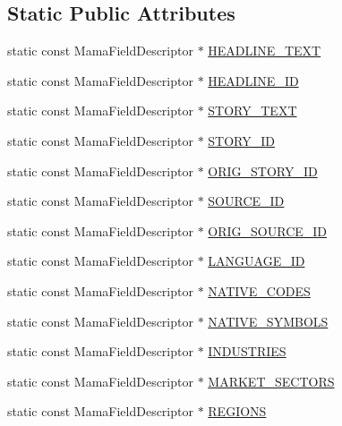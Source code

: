 \subsection*{Static Public Attributes}
\begin{CompactItemize}
\item 
static const Mama\-Field\-Descriptor $\ast$ \hyperlink{classWombat_1_1MamdaNewsFields_df0770dbf356ee43cc6cc20e9ab64843}{HEADLINE\_\-TEXT}
\item 
static const Mama\-Field\-Descriptor $\ast$ \hyperlink{classWombat_1_1MamdaNewsFields_1ac44bc2c63050375b991c8f00e60b25}{HEADLINE\_\-ID}
\item 
static const Mama\-Field\-Descriptor $\ast$ \hyperlink{classWombat_1_1MamdaNewsFields_11e94d0ee71a5c90649aeca33a4a07c5}{STORY\_\-TEXT}
\item 
static const Mama\-Field\-Descriptor $\ast$ \hyperlink{classWombat_1_1MamdaNewsFields_e83dd9259c49764c6352fb6806d39607}{STORY\_\-ID}
\item 
static const Mama\-Field\-Descriptor $\ast$ \hyperlink{classWombat_1_1MamdaNewsFields_f20799816614ed8e39163c14d5b4a90b}{ORIG\_\-STORY\_\-ID}
\item 
static const Mama\-Field\-Descriptor $\ast$ \hyperlink{classWombat_1_1MamdaNewsFields_3d58ace26bd951659ac6245938308525}{SOURCE\_\-ID}
\item 
static const Mama\-Field\-Descriptor $\ast$ \hyperlink{classWombat_1_1MamdaNewsFields_683de9d8a7221514a8e5fc577e333caa}{ORIG\_\-SOURCE\_\-ID}
\item 
static const Mama\-Field\-Descriptor $\ast$ \hyperlink{classWombat_1_1MamdaNewsFields_f65f30ddf65d563a317dae4a2888e5f5}{LANGUAGE\_\-ID}
\item 
static const Mama\-Field\-Descriptor $\ast$ \hyperlink{classWombat_1_1MamdaNewsFields_d7e45841372387ae806abb5f24657047}{NATIVE\_\-CODES}
\item 
static const Mama\-Field\-Descriptor $\ast$ \hyperlink{classWombat_1_1MamdaNewsFields_c1255f4d20e6f0751ade605590709ea5}{NATIVE\_\-SYMBOLS}
\item 
static const Mama\-Field\-Descriptor $\ast$ \hyperlink{classWombat_1_1MamdaNewsFields_7b653e701b00cc6428b0e5e4bdc47107}{INDUSTRIES}
\item 
static const Mama\-Field\-Descriptor $\ast$ \hyperlink{classWombat_1_1MamdaNewsFields_e86fe82cd9f617ee0cae392697aa7fdf}{MARKET\_\-SECTORS}
\item 
static const Mama\-Field\-Descriptor $\ast$ \hyperlink{classWombat_1_1MamdaNewsFields_5f83e6f931980d98d0758cb265eb33ff}{REGIONS}

\end{CompactItemize}
